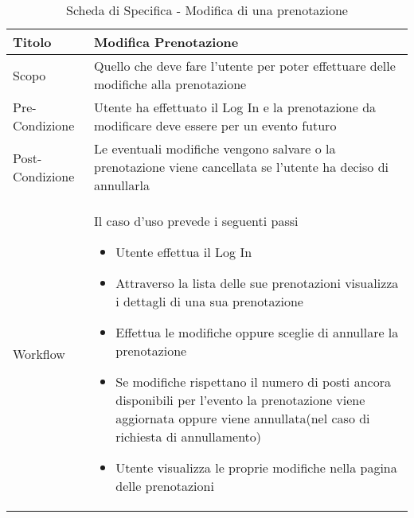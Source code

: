 \begin{table}[H]
    \begin{center}  
        \begin{tabular}{ | l | p{13cm} |} %
        \hline
        \textbf{Titolo} & \textbf{Modifica Prenotazione}\\ \hline  
           
        Scopo & Quello che deve fare l'utente per poter effettuare delle modifiche alla prenotazione\\ \hline  
           
        Pre-Condizione & Utente ha effettuato il Log In e la prenotazione da modificare deve essere per un evento futuro\\ \hline  
           
        Post-Condizione & Le eventuali modifiche vengono salvare o la prenotazione viene cancellata se l'utente ha deciso di annullarla\\ \hline  
           
        Workflow & Il caso d'uso prevede i seguenti passi
        \begin{itemize}
            \item Utente effettua il Log In
            \item Attraverso la lista delle sue prenotazioni visualizza i dettagli di una sua prenotazione
            \item Effettua le modifiche oppure sceglie di annullare la prenotazione
            \item Se modifiche rispettano il numero di posti ancora disponibili per l'evento la prenotazione viene aggiornata oppure viene annullata(nel caso di richiesta di annullamento)
            \item Utente visualizza le proprie modifiche nella pagina delle prenotazioni
        \end{itemize}\\ \hline  
           
        \end{tabular}  
        \caption{Scheda di Specifica - Modifica di una prenotazione}
    \end{center}  
\end{table}